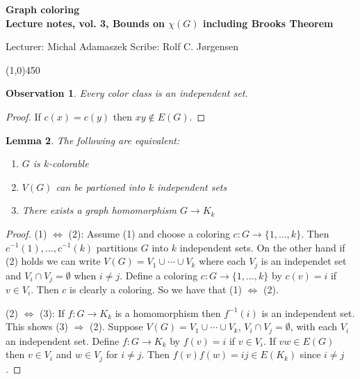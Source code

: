 \documentclass[a4paper]{article}
\theoremstyle{plain}
\newtheorem{lemma}{Lemma}
\newtheorem{observation}[lemma]{Observation}
\theoremstyle{myremark}
\newcommand{\LECTURENUMBER}{3}
\newcommand{\LECTURETITLE}{Bounds on $\chi(G)$ including Brooks
Theorem}
\newcommand{\LECTURESCRIBE}{Rolf C. Jørgensen}
\begin{document}
\thispagestyle{empty}

\begin{center}
	{\Large\bf Graph coloring}\\
	{\bf Lecture notes, vol. \LECTURENUMBER, \LECTURETITLE}\\
\end{center}
Lecturer: Michal Adamaszek \hfill Scribe: \LECTURESCRIBE
\begin{center}
\line(1,0){450}
\end{center}


\begin{observation}
Every color class is an independent set.
\end{observation}
\begin{proof}
If $c(x) = c(y)$ then $xy \notin E(G)$.
\end{proof}

\begin{lemma}
The following are equivalent:
\begin{enumerate}[(1)]
\item $G$ is $k$-colorable
\item $V(G)$ can be partioned into $k$ independent sets
\item There exists a graph homomorphism $G \rightarrow K_k$
\end{enumerate}
\end{lemma}
\begin{proof}
(1) $\Leftrightarrow$ (2): Assume (1) and choose a coloring $c \colon G
\rightarrow \{1,\ldots,k\}$. Then $c^{-1}(1),\ldots,c^{-1}(k)$
partitions $G$ into $k$ independent sets. On the other hand if (2) holds
we can write $V(G) = V_1 \cup \cdots \cup V_k$ where each $V_j$ is an
independet set and $V_i \cap V_j = \emptyset$ when $i \neq j$. Define a
coloring $c \colon G \rightarrow \{1,\ldots,k\}$ by $c(v) = i$ if $v \in
V_i$. Then $c$ is clearly a coloring. So we have that (1)
$\Leftrightarrow$ (2).

(2) $\Leftrightarrow$ (3): If $f \colon G \rightarrow K_k$ is a
homomorphism then $f^{-1}(i)$ is an independent set. This shows (3)
$\Rightarrow$ (2). Suppose $V(G) = V_1 \cup \cdots \cup V_k$, $V_i \cap
V_j = \emptyset$, with each $V_i$ an independent set. Define $f \colon G
\rightarrow K_k$ by $f(v) = i$ if $v \in V_i$. If $vw \in E(G)$ then $v
\in V_i$ and $w \in V_j$ for $i \neq j$. Then $f(v)f(w) = ij \in E(K_k)$
since $i \neq j$.
\end{proof}
\end{document}
